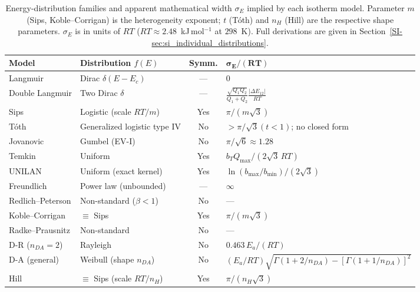\documentclass[journal=jacsat,manuscript=article]{achemso}
\begin{document}
	\begin{table}[H]
		\small
		\caption{Energy-distribution families and apparent mathematical width $\sigma_E$ implied by each isotherm model. Parameter $m$ (Sips, Koble--Corrigan) is the heterogeneity exponent; $t$ (T\'{o}th) and $n_H$ (Hill) are the respective shape parameters. $\sigma_E$ is in units of $RT$ ($RT\approx 2.48$~kJ\,mol$^{-1}$ at $298$~K). Full derivations are given in Section~\ref{SI-sec:si_individual_distributions}.}
		\label{tab:energy_distributions}
		\renewcommand{\arraystretch}{1.4}
		\begin{tabular}{@{} l l c l @{}}
			\hline
			\textbf{Model}
			& \textbf{Distribution $f(E)$}
			& \textbf{Symm.}
			& $\boldsymbol{\sigma_E/(RT)}$ \\
			\hline
			Langmuir
			& Dirac $\delta(E-E_c)$
			& ---
			& $0$ \\
			Double Langmuir
			& Two Dirac $\delta$
			& ---
			& $\tfrac{\sqrt{Q_1 Q_2}}{Q_1+Q_2}\tfrac{|\Delta E_{12}|}{RT}$ \\
			Sips
			& Logistic (scale $RT/m$)
			& Yes
			& $\pi/(m\sqrt{3})$ \\
			T\'{o}th
			& Generalized logistic type IV
			& No
			& $>\pi/\sqrt{3}$\;$(t<1)$; no closed form \\
			Jovanovic
			& Gumbel (EV-I)
			& No
			& $\pi/\sqrt{6}\approx 1.28$ \\
			Temkin
			& Uniform
			& Yes
			& $b_T Q_{\max}/(2\sqrt{3}\,RT)$ \\
			UNILAN
			& Uniform (exact kernel)
			& Yes
			& $\ln(b_{\max}/b_{\min})/(2\sqrt{3})$ \\
			Freundlich
			& Power law (unbounded)
			& ---
			& $\infty$ \\
			Redlich--Peterson
			& Non-standard ($\beta < 1$)
			& No
			& --- \\
			Koble--Corrigan
			& $\equiv$ Sips
			& Yes
			& $\pi/(m\sqrt{3})$ \\
			Radke--Prausnitz
			& Non-standard
			& No
			& --- \\
			D-R ($n_{DA}=2$)
			& Rayleigh
			& No
			& $0.463\,E_a/(RT)$ \\
			D-A (general)
			& Weibull (shape $n_{DA}$)
			& No
			& $(E_a/RT)\sqrt{\Gamma(1+2/n_{DA})-[\Gamma(1+1/n_{DA})]^2}$ \\
			Hill
			& $\equiv$ Sips (scale $RT/n_H$)
			& Yes
			& $\pi/(n_H\sqrt{3})$ \\
			\hline
		\end{tabular}
	\end{table}
	
\end{document}
